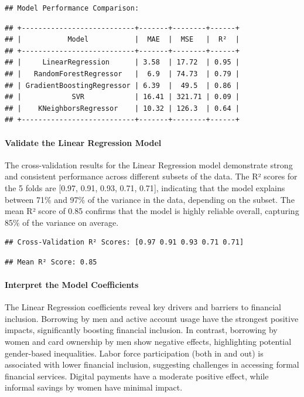 \documentclass[preprint, 3p,
authoryear]{elsarticle} %
\begin{document}
\begin{verbatim}
## Model Performance Comparison:
\end{verbatim}

\begin{verbatim}
## +---------------------------+-------+--------+------+
## |           Model           |  MAE  |  MSE   |  R²  |
## +---------------------------+-------+--------+------+
## |     LinearRegression      | 3.58  | 17.72  | 0.95 |
## |   RandomForestRegressor   |  6.9  | 74.73  | 0.79 |
## | GradientBoostingRegressor | 6.39  |  49.5  | 0.86 |
## |            SVR            | 16.41 | 321.71 | 0.09 |
## |    KNeighborsRegressor    | 10.32 | 126.3  | 0.64 |
## +---------------------------+-------+--------+------+
\end{verbatim}

\paragraph{Validate the Linear Regression
Model}\label{validate-the-linear-regression-model}

The cross-validation results for the Linear Regression model demonstrate
strong and consistent performance across different subsets of the data.
The R² scores for the 5 folds are {[}0.97, 0.91, 0.93, 0.71, 0.71{]},
indicating that the model explains between 71\% and 97\% of the variance
in the data, depending on the subset. The mean R² score of 0.85 confirms
that the model is highly reliable overall, capturing 85\% of the
variance on average.

\begin{verbatim}
## Cross-Validation R² Scores: [0.97 0.91 0.93 0.71 0.71]
\end{verbatim}

\begin{verbatim}
## Mean R² Score: 0.85
\end{verbatim}

\paragraph{Interpret the Model
Coefficients}\label{interpret-the-model-coefficients}

The Linear Regression coefficients reveal key drivers and barriers to
financial inclusion. Borrowing by men and active account usage have the
strongest positive impacts, significantly boosting financial inclusion.
In contrast, borrowing by women and card ownership by men show negative
effects, highlighting potential gender-based inequalities. Labor force
participation (both in and out) is associated with lower financial
inclusion, suggesting challenges in accessing formal financial services.
Digital payments have a moderate positive effect, while informal savings
by women have minimal impact.
\end{document}
